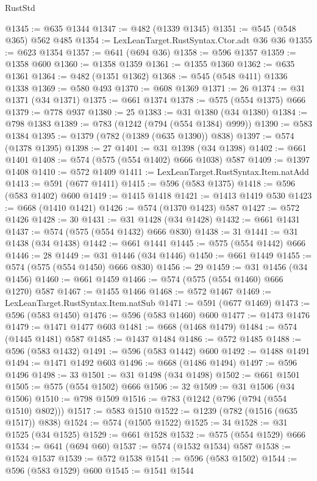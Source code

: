 \begin{lexlean}{RustStd}
\begin{coremodule}
@1345 := @635 @1344
@1347 := @482 (@1339 @1345)
@1351 := @545 (@548 @365) @562 @485
@1354 := LexLeanTarget.RustSyntax.Ctor.adt @36 @36
@1355 := @623 @1354
@1357 := @641 (@694 @36)
@1358 := @596 @1357
@1359 := @1358 @600
@1360 := @1358 @1359
@1361 := @1355 @1360
@1362 := @635 @1361
@1364 := @482 (@1351 @1362)
@1368 := @545 (@548 @411) @1336 @1338
@1369 := @580 @493
@1370 := @608 @1369
@1371 := 26
@1374 := @31 @1371 (@34 @1371)
@1375 := @661 @1374
@1378 := @575 (@554 @1375) @666
@1379 := @778 @937
@1380 := 25
@1383 := @31 @1380 (@34 @1380)
@1384 := @798 @1383
@1389 := @783 (@1242 (@794 (@554 @1384) @999))
@1390 := @583 @1384
@1395 := @1379 (@782 (@1389 (@635 @1390)) @838)
@1397 := @574 (@1378 @1395)
@1398 := 27
@1401 := @31 @1398 (@34 @1398)
@1402 := @661 @1401
@1408 := @574 (@575 (@554 @1402) @666 @1038) @587
@1409 := @1397 @1408
@1410 := @572 @1409
@1411 := LexLeanTarget.RustSyntax.Item.natAdd
@1413 := @591 (@677 @1411)
@1415 := @596 (@583 @1375)
@1418 := @596 (@583 @1402) @600
@1419 := @1415 @1418
@1421 := @1413 @1419 @530
@1423 := @668 (@1410 @1421)
@1426 := @574 (@1370 @1423) @587
@1427 := @572 @1426
@1428 := 30
@1431 := @31 @1428 (@34 @1428)
@1432 := @661 @1431
@1437 := @574 (@575 (@554 @1432) @666 @830)
@1438 := 31
@1441 := @31 @1438 (@34 @1438)
@1442 := @661 @1441
@1445 := @575 (@554 @1442) @666
@1446 := 28
@1449 := @31 @1446 (@34 @1446)
@1450 := @661 @1449
@1455 := @574 (@575 (@554 @1450) @666 @830)
@1456 := 29
@1459 := @31 @1456 (@34 @1456)
@1460 := @661 @1459
@1466 := @574 (@575 (@554 @1460) @666 @1270) @587
@1467 := @1455 @1466
@1468 := @572 @1467
@1469 := LexLeanTarget.RustSyntax.Item.natSub
@1471 := @591 (@677 @1469)
@1473 := @596 (@583 @1450)
@1476 := @596 (@583 @1460) @600
@1477 := @1473 @1476
@1479 := @1471 @1477 @603
@1481 := @668 (@1468 @1479)
@1484 := @574 (@1445 @1481) @587
@1485 := @1437 @1484
@1486 := @572 @1485
@1488 := @596 (@583 @1432)
@1491 := @596 (@583 @1442) @600
@1492 := @1488 @1491
@1494 := @1471 @1492 @603
@1496 := @668 (@1486 @1494)
@1497 := @596 @1496
@1498 := 33
@1501 := @31 @1498 (@34 @1498)
@1502 := @661 @1501
@1505 := @575 (@554 @1502) @666
@1506 := 32
@1509 := @31 @1506 (@34 @1506)
@1510 := @798 @1509
@1516 := @783 (@1242 (@796 (@794 (@554 @1510) @802)))
@1517 := @583 @1510
@1522 := @1239 (@782 (@1516 (@635 @1517)) @838)
@1524 := @574 (@1505 @1522)
@1525 := 34
@1528 := @31 @1525 (@34 @1525)
@1529 := @661 @1528
@1532 := @575 (@554 @1529) @666
@1534 := @641 (@694 @60)
@1537 := @574 (@1532 @1534) @587
@1538 := @1524 @1537
@1539 := @572 @1538
@1541 := @596 (@583 @1502)
@1544 := @596 (@583 @1529) @600
@1545 := @1541 @1544

\end{coremodule}
\end{lexlean}
